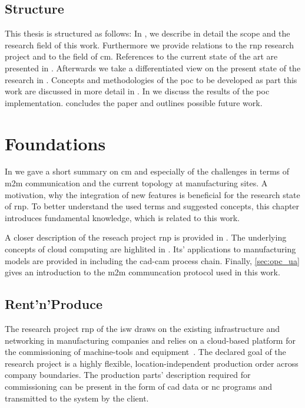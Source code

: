 \documentclass[
a4paper,
twoside,
headsepline,
cleardoublepage=empty,
parskip=half,
draft=false
]{scrbook}
\begin{document}
		\section{Structure}

			This thesis is structured as follows: In , we describe in detail the scope and the research field of this work.
			Furthermore we provide relations to the \gls{rnp} research project and to the field of \gls{cm}.
			References to the current state of the art are presented in .
			Afterwards we take a differentiated view on the present state of the research in .
			Concepts and methodologies of the \gls{poc} to be developed as part this work are discussed in more detail in .
			In  we discuss the results of the \gls{poc} implementation.
			 concludes the paper and outlines possible future work.

	\chapter{Foundations}\label{ch:foundations}

		In  we gave a short summary on \gls{cm} and especially of the challenges in terms of \gls{m2m} communication and the current topology at manufacturing sites.
		A motivation, why the integration of new features is beneficial for the research state of \gls{rnp}.
		To better understand the used terms and suggested concepts, this chapter introduces fundamental knowledge, which is related to this work.

		A closer description of the reseach project \gls{rnp} is provided in .
		The underlying concepts of cloud computing are highlited in .
		Its' applications to manufacturing models are provided in  including the \gls{cad}-\gls{cam} process chain.
		Finally, \cref{sec:opc_ua} gives an introduction to the \gls{m2m} communcation protocol used in this work.

		\section{Rent'n'Produce}\label{sec:rent_n_produce}

			The research project \gls{rnp} of the \gls{isw} draws on the existing infrastructure and networking in manufacturing companies and relies on a cloud-based platform for the commissioning of machine-tools and equipment~\cite{xen.17b}. The declared goal of the research project is a highly flexible, location-independent production order across company boundaries. The production parts' description required for commissioning can be present in the form of \gls{cad} data or \gls{nc} programs and transmitted to the system by the client.
			
\end{document}
